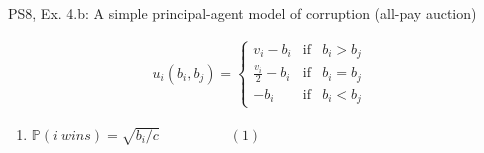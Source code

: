 \begin{frame}{PS8, Ex. 4.b: A simple principal-agent model of corruption (all-pay auction)}
\begin{multicols}{2}
      \begin{align*}
        u_i(b_i,b_j)=\left\{\begin{array}{lcl}
          v_i-b_i           & \text{if} & b_i>b_j \\
          \frac{v_i}{2}-b_i & \text{if} & b_i=b_j \\
          -b_i              & \text{if} & b_i<b_j
        \end{array}\right.
      \end{align*} \vspace{-16pt}
      \begin{enumerate}
        \item $\mathbb{P}(i\ wins)=\sqrt{b_i/c}\quad\quad\quad\quad\quad(1)$
      \end{enumerate}
      \vfill\null
    \end{multicols}
\end{frame}
